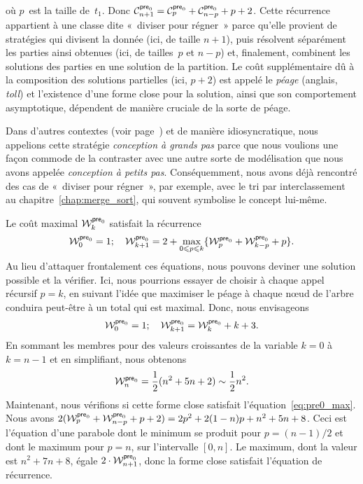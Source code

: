 où \(p\)~est la taille de~\(t_1\). Donc \(\C{\fun{pre}_0}{n+1} =
\C{\fun{pre}_0}{p} + \C{\fun{pre}_0}{n-p} + p + 2\). Cette récurrence
appartient à une classe dite «~diviser pour
régner~» parce qu'elle provient de
stratégies qui divisent la donnée (ici, de taille \(n+1\)), puis
résolvent séparément les parties ainsi obtenues (ici, de tailles~\(p\)
et \(n-p\)) et, finalement, combinent les solutions des parties en une
solution de la partition. Le coût supplémentaire dû à la composition
des solutions partielles (ici, \(p+2\)) est appelé le
\emph{péage} (anglais, \emph{toll}) et l'existence d'une
forme close pour la solution, ainsi que son comportement asymptotique,
dépendent de manière cruciale de la sorte de péage.

Dans d'autres contextes (voir page~\pageref{big-step}) et de manière
idiosyncratique, nous appelions cette stratégie \emph{conception à
  grands pas} parce que nous voulions une
façon commode de la contraster avec une autre sorte de modélisation
que nous avons appelée \emph{conception à petits
  pas}. Conséquemment, nous avons déjà
rencontré des cas de «~diviser pour régner~», par exemple, avec le tri
par interclassement au
chapitre~\vref{chap:merge_sort}, qui souvent symbolise le concept
lui-même.

Le coût maximal
\(\W{\fun{pre}_0}{k}\) satisfait la
récurrence
\begin{equation}
\W{\fun{pre}_0}{0} = 1;\quad
\W{\fun{pre}_0}{k+1} =
  2 + \max_{0 \leqslant p \leqslant k}\{\W{\fun{pre}_0}{p}
                                  + \W{\fun{pre}_0}{k-p} + p\}.
\index{pre0@$\W{\fun{pre}_0}{n}$}
\label{eq:pre0_max}
\end{equation}
Au lieu d'attaquer frontalement ces équations, nous pouvons deviner
une solution possible et la vérifier. Ici, nous pourrions essayer de
choisir à chaque appel récursif \(p=k\), en suivant l'idée que
maximiser le péage à chaque nœud de l'arbre conduira peut-être à
un total qui est maximal. Donc, nous envisageons
\begin{equation}
\W{\fun{pre}_0}{0} = 1;\quad
\W{\fun{pre}_0}{k+1} = \W{\fun{pre}_0}{k} + k + 3.
\label{eq:max_pre0_rec}
\end{equation}
En sommant les membres pour des valeurs croissantes de la variable
\(k=0\) à \(k=n-1\) et en simplifiant, nous obtenons
\begin{equation*}
\W{\fun{pre}_0}{n} = \frac{1}{2}(n^2 + 5n + 2) \sim \frac{1}{2}n^2.
\end{equation*}
Maintenant, nous vérifions si cette forme close satisfait
l'équation~\eqref{eq:pre0_max}. Nous avons \(2(\W{\fun{pre}_0}{p} +
\W{\fun{pre}_0}{n-p} + p + 2) = 2p^2 + 2(1-n)p + n^2 + 5n + 8\). Ceci
est l'équation d'une parabole dont le minimum se produit pour \(p =
(n-1)/2\) et dont le maximum pour \(p = n\), sur l'intervalle
\([0,n]\). Le maximum, dont la valeur est \(n^2 + 7n + 8\), égale \(2
\cdot \W{\fun{pre}_0}{n+1}\), donc la forme close satisfait l'équation
de récurrence.

